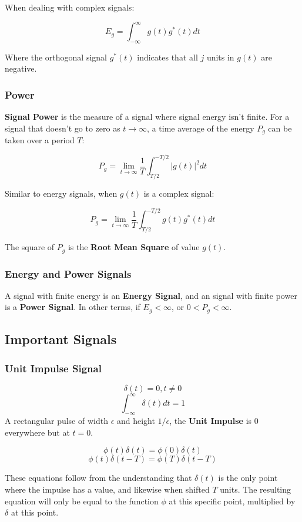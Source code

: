 \documentclass[11pt]{article}
\begin{document}
When dealing with complex signals:

$$E_g = \int^{\infty}_{-\infty}g(t)g^*(t) dt$$

Where the orthogonal signal $g^*(t)$ indicates that all $j$ units in $g(t)$ are negative.

\subsubsection{Power}

\textbf{Signal Power} is the measure of a signal where signal energy isn't finite. For a signal that doesn't go to zero as $t \rightarrow \infty$, a time average of the energy $P_g$ can be taken over a period $T$:

$$P_g = \lim_{t\to\infty} \frac{1}{T}\int_{T/2}^{-T/2} |g(t)|^2 dt$$

Similar to energy signals, when $g(t)$ is a complex signal:

$$P_g = \lim_{t\to\infty} \frac{1}{T}\int_{T/2}^{-T/2} g(t)g^*(t) dt$$


\hfill \break 
The square of $P_g$ is the \textbf{Root Mean Square} of value $g(t)$.

\subsubsection{Energy and Power Signals}

A signal with finite energy is an \textbf{Energy Signal}, and an signal with finite power is a \textbf{Power Signal}. In other terms, if $E_g < \infty$, or $0 < P_g < \infty$.

\subsection{Important Signals}
\subsubsection{Unit Impulse Signal}

$$\delta(t) = 0, t \neq 0$$
$$\int^{\infty}_{-\infty}\delta(t)dt = 1$$
\hfill \break 
A rectangular pulse of width $\epsilon$ and height $1/\epsilon$, the \textbf{Unit Impulse} is 0 everywhere but at $t = 0$.

$$\phi(t)\delta(t) = \phi(0)\delta(t)$$
$$\phi(t)\delta(t - T) = \phi(T)\delta(t - T)$$

\hfill \break
These equations follow from the understanding that $\delta(t)$ is the only point where the impulse has a value, and likewise when shifted $T$ units. The resulting equation will only be equal to the function $\phi$ at this specific point, multiplied by $\delta$ at this point.
\end{document}
